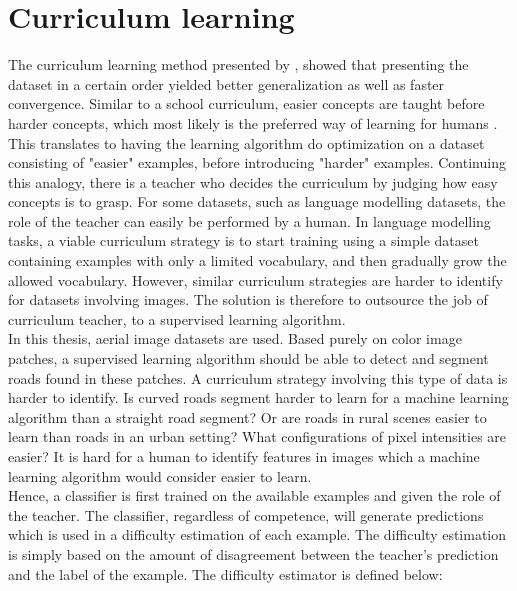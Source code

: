 \section{Curriculum learning}
\label{sec:curriculum_learning}
The curriculum learning method presented by \cite{Bengio_curriculumlearning}, showed that presenting the dataset in a certain order yielded better generalization as well as faster convergence. Similar to a school curriculum, easier concepts are taught before harder concepts, which most likely is the preferred way of learning for humans \citep{Khan_human_teach}. This translates to having the learning algorithm do optimization on a dataset consisting of "easier" examples, before introducing "harder" examples. Continuing this analogy, there is a teacher who decides the curriculum by judging how easy concepts is to grasp. For some datasets, such as language modelling datasets, the role of the teacher can easily be performed by a human. In language modelling tasks, a viable curriculum strategy is to start training using a simple dataset containing examples with only a limited vocabulary, and then gradually grow the allowed vocabulary. However, similar curriculum strategies are harder to identify for datasets involving images. The solution is therefore to outsource the job of curriculum teacher, to a supervised learning algorithm.  \\

In this thesis, aerial image datasets are used. Based purely on color image patches, a supervised learning algorithm should be able to detect and segment roads found in these patches. A curriculum strategy involving this type of data is harder to identify. Is curved roads segment harder to learn for a machine learning algorithm than a straight road segment? Or are roads in rural scenes easier to learn than roads in an urban setting? What configurations of pixel intensities are easier? It is hard for a human to identify features in images which a machine learning algorithm would consider easier to learn. \\


Hence, a classifier is first trained on the available examples and given the role of the teacher. The classifier, regardless of competence, will generate predictions which is used in a difficulty estimation of each example. The difficulty estimation is simply based on the amount of disagreement between the teacher's prediction and the label of the example. The difficulty estimator is defined below:  \\

